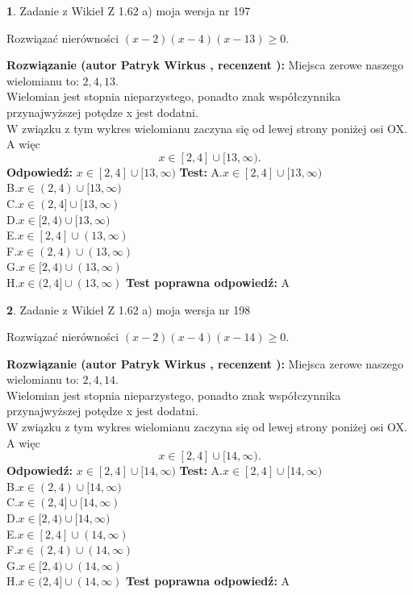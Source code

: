 \documentclass[12pt, a4paper]{article}
\theoremstyle{definition} %
\newtheorem{zad}{}
\newcommand{\zadStart}[1]{\begin{zad}#1\newline}
\newcommand{\zadStop}{\end{zad}}
\newcommand{\rozwStart}[2]{\noindent \textbf{Rozwiązanie (autor #1 , recenzent #2): }\newline}
\newcommand{\rozwStop}{\newline}
\newcommand{\odpStart}{\noindent \textbf{Odpowiedź:}\newline}
\newcommand{\odpStop}{\newline}
\newcommand{\testStart}{\noindent \textbf{Test:}\newline}
\newcommand{\testStop}{\newline}
\newcommand{\kluczStart}{\noindent \textbf{Test poprawna odpowiedź:}\newline}
\newcommand{\kluczStop}{\newline}
\begin{document}
\zadStart{Zadanie z Wikieł Z 1.62 a) moja wersja nr 197}

Rozwiązać nierówności $(x-2)(x-4)(x-13)\ge0$.
\zadStop
\rozwStart{Patryk Wirkus}{}
Miejsca zerowe naszego wielomianu to: $2, 4, 13$.\\
Wielomian jest stopnia nieparzystego, ponadto znak współczynnika przy\linebreak najwyższej potędze x jest dodatni.\\ W związku z tym wykres wielomianu zaczyna się od lewej strony poniżej osi OX. A więc $$x \in [2,4] \cup [13,\infty).$$
\rozwStop
\odpStart
$x \in [2,4] \cup [13,\infty)$
\odpStop
\testStart
A.$x \in [2,4] \cup [13,\infty)$\\
B.$x \in (2,4) \cup [13,\infty)$\\
C.$x \in (2,4] \cup [13,\infty)$\\
D.$x \in [2,4) \cup [13,\infty)$\\
E.$x \in [2,4] \cup (13,\infty)$\\
F.$x \in (2,4) \cup (13,\infty)$\\
G.$x \in [2,4) \cup (13,\infty)$\\
H.$x \in (2,4] \cup (13,\infty)$
\testStop
\kluczStart
A
\kluczStop



\zadStart{Zadanie z Wikieł Z 1.62 a) moja wersja nr 198}

Rozwiązać nierówności $(x-2)(x-4)(x-14)\ge0$.
\zadStop
\rozwStart{Patryk Wirkus}{}
Miejsca zerowe naszego wielomianu to: $2, 4, 14$.\\
Wielomian jest stopnia nieparzystego, ponadto znak współczynnika przy\linebreak najwyższej potędze x jest dodatni.\\ W związku z tym wykres wielomianu zaczyna się od lewej strony poniżej osi OX. A więc $$x \in [2,4] \cup [14,\infty).$$
\rozwStop
\odpStart
$x \in [2,4] \cup [14,\infty)$
\odpStop
\testStart
A.$x \in [2,4] \cup [14,\infty)$\\
B.$x \in (2,4) \cup [14,\infty)$\\
C.$x \in (2,4] \cup [14,\infty)$\\
D.$x \in [2,4) \cup [14,\infty)$\\
E.$x \in [2,4] \cup (14,\infty)$\\
F.$x \in (2,4) \cup (14,\infty)$\\
G.$x \in [2,4) \cup (14,\infty)$\\
H.$x \in (2,4] \cup (14,\infty)$
\testStop
\kluczStart
A
\kluczStop
\end{document}
